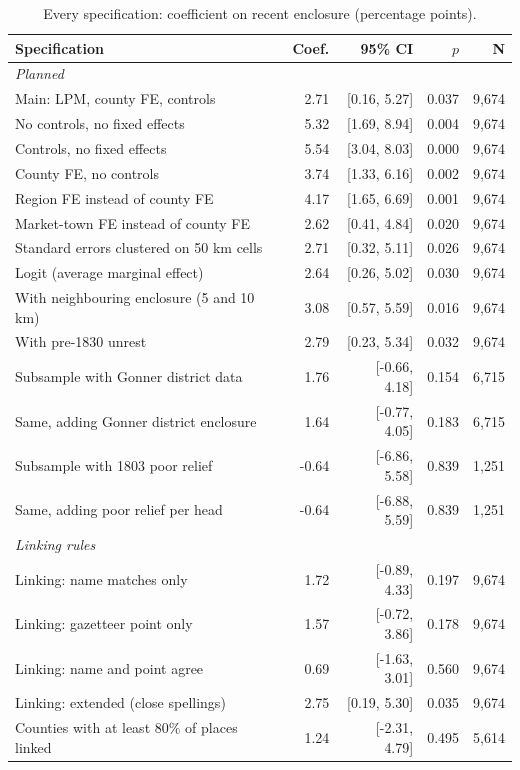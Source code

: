 \documentclass[11pt,a4paper]{article}
\begin{document}
\begin{table}[tbp]\centering\footnotesize\caption{Every specification: coefficient on recent enclosure (percentage points).}\label{tab:rob}\begin{tabular}{p{7.6cm}rrrr}\toprule Specification & Coef. & 95\% CI & $p$ & N\\\midrule
\multicolumn{5}{l}{\textit{Planned}}\\
Main: LPM, county FE, controls & 2.71 & [0.16, 5.27] & 0.037 & 9,674\\
No controls, no fixed effects & 5.32 & [1.69, 8.94] & 0.004 & 9,674\\
Controls, no fixed effects & 5.54 & [3.04, 8.03] & 0.000 & 9,674\\
County FE, no controls & 3.74 & [1.33, 6.16] & 0.002 & 9,674\\
Region FE instead of county FE & 4.17 & [1.65, 6.69] & 0.001 & 9,674\\
Market-town FE instead of county FE & 2.62 & [0.41, 4.84] & 0.020 & 9,674\\
Standard errors clustered on 50 km cells & 2.71 & [0.32, 5.11] & 0.026 & 9,674\\
Logit (average marginal effect) & 2.64 & [0.26, 5.02] & 0.030 & 9,674\\
With neighbouring enclosure (5 and 10 km) & 3.08 & [0.57, 5.59] & 0.016 & 9,674\\
With pre-1830 unrest & 2.79 & [0.23, 5.34] & 0.032 & 9,674\\
Subsample with Gonner district data & 1.76 & [-0.66, 4.18] & 0.154 & 6,715\\
Same, adding Gonner district enclosure & 1.64 & [-0.77, 4.05] & 0.183 & 6,715\\
Subsample with 1803 poor relief & -0.64 & [-6.86, 5.58] & 0.839 & 1,251\\
Same, adding poor relief per head & -0.64 & [-6.88, 5.59] & 0.839 & 1,251\\
\multicolumn{5}{l}{\textit{Linking rules}}\\
Linking: name matches only & 1.72 & [-0.89, 4.33] & 0.197 & 9,674\\
Linking: gazetteer point only & 1.57 & [-0.72, 3.86] & 0.178 & 9,674\\
Linking: name and point agree & 0.69 & [-1.63, 3.01] & 0.560 & 9,674\\
Linking: extended (close spellings) & 2.75 & [0.19, 5.30] & 0.035 & 9,674\\
Counties with at least 80\% of places linked & 1.24 & [-2.31, 4.79] & 0.495 & 5,614\\

\end{tabular}
\end{table}
\end{document}
